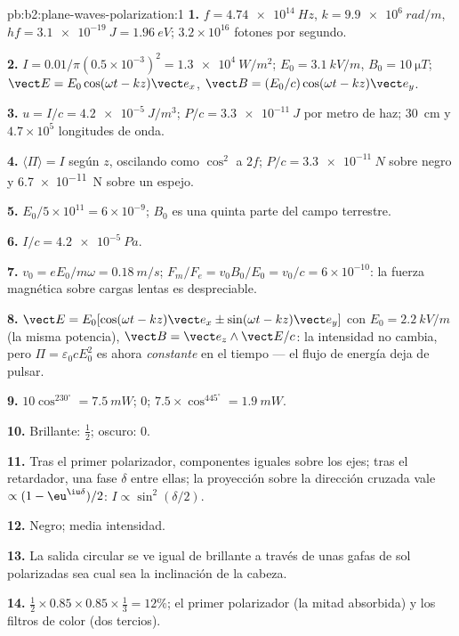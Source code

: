 \begin{solution}{pb:b2:plane-waves-polarization:1}
\textbf{1.} $f = \qty{4.74e14}{Hz}$, $k = \qty{9.9e6}{rad/m}$, $hf = \qty{3.1e-19}{J} =
\qty{1.96}{eV}$; $3.2 \times 10^{16}$ fotones por segundo.

\textbf{2.} $I = 0.01/\pi(0.5 \times 10^{-3})^2 = \qty{1.3e4}{W/m^2}$; $E_0 = \qty{3.1}{kV/m}$,
$B_0 = \qty{10}{\micro T}$; $\vect E = E_0\cos(\omega t - kz)\vect e_x$, $\vect B = (E_0/c)\cos(\omega t
- kz)\vect e_y$.

\textbf{3.} $u = I/c = \qty{4.2e-5}{J/m^3}$; $P/c = \qty{3.3e-11}{J}$ por metro de
haz; \qty{30}{cm} y $4.7 \times 10^5$ longitudes de onda.

\textbf{4.} $\langle\Pi\rangle = I$ según $z$, oscilando como $\cos^2$ a $2f$;
$P/c = \qty{3.3e-11}{N}$ sobre negro y \qty{6.7e-11}{N} sobre un espejo.

\textbf{5.} $E_0/5 \times 10^{11} = 6 \times 10^{-9}$; $B_0$ es una quinta parte del
campo terrestre.

\textbf{6.} $I/c = \qty{4.2e-5}{Pa}$.

\textbf{7.} $v_0 = eE_0/m\omega = \qty{0.18}{m/s}$; $F_m/F_e = v_0B_0/E_0 = v_0/c = 6 \times
10^{-10}$: la fuerza magnética sobre cargas lentas es despreciable.

\textbf{8.} $\vect E = E_0[\cos(\omega t - kz)\vect e_x \pm \sin(\omega t - kz)\vect e_y]$ con
$E_0 = \qty{2.2}{kV/m}$ (la misma potencia), $\vect B = \vect e_z\wedge\vect E/c$: la
intensidad no cambia, pero $\Pi = \varepsilon_0cE_0^2$ es ahora \emph{constante} en
el tiempo --- el flujo de energía deja de pulsar.

\textbf{9.} $10\cos^230^\circ = \qty{7.5}{mW}$; $0$; $7.5 \times \cos^445^\circ = \qty{1.9}{mW}$.

\textbf{10.} Brillante: $\tfrac12$; oscuro: $0$.

\textbf{11.} Tras el primer polarizador, componentes iguales sobre los
ejes; tras el retardador, una fase $\delta$ entre ellas; la proyección sobre
la dirección cruzada vale $\propto(1 - \eu^{\iu\delta})/2$: $I \propto \sin^2(\delta/2)$.

\textbf{12.} Negro; media intensidad.

\textbf{13.} La salida circular se ve igual de brillante a través de unas
gafas de sol polarizadas sea cual sea la inclinación de la cabeza.

\textbf{14.} $\tfrac12 \times 0.85 \times 0.85 \times \tfrac13 = 12\%$; el primer polarizador
(la mitad absorbida) y los filtros de color (dos tercios).


\end{solution}
